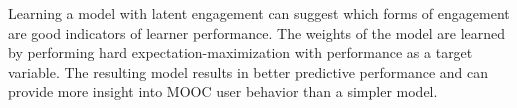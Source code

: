 %

Learning a model with latent engagement can suggest which forms of engagement are good indicators of learner performance. The weights of the model are learned by performing hard expectation-maximization with performance as a target variable. The resulting model results in better predictive performance and can provide more insight into MOOC user behavior than a simpler model.

